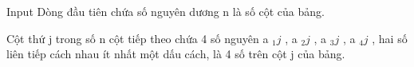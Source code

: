 Input
Dòng đầu tiên chứa số nguyên dương n là số cột của bảng.

Cột thứ j trong số n cột tiếp theo chứa 4 số nguyên a $_ 1j $ , a $_ 2j $ , a $_ 3j $ , a $_ 4j $ , hai số liên tiếp cách nhau ít nhất một dấu cách, là 4 số trên cột j của bảng.